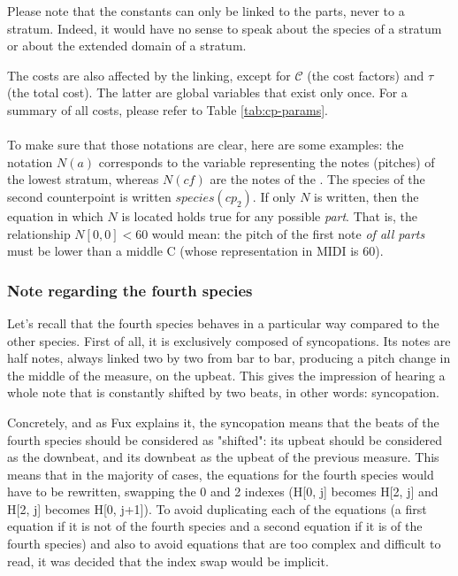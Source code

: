 Please note that the constants can only be linked to the parts, never to a stratum. Indeed, it would have no sense to speak about the species of a stratum or about the extended domain of a stratum.

The costs are also affected by the linking, except for $\mathcal{C}$ (the cost factors) and $\tau$ (the total cost). The latter are global variables that exist only once. For a summary of all costs, please refer to Table \ref{tab:cp-params}.

\paragraph{}
To make sure that those notations are clear, here are some examples: the notation $N(a)$ corresponds to the variable representing the notes (pitches) of the lowest stratum, whereas $N(\mathit{cf})$ are the notes of the \cf. The species of the second counterpoint is written $species(cp_2)$. If only $N$ is written, then the equation in which $N$ is located holds true for any possible \textit{part}. That is, the relationship $N[0, 0] < 60$ would mean: the pitch of the first note \textit{of all parts} must be lower than a middle C (whose representation in MIDI is 60).

\subsubsection{Note regarding the fourth species}\label{nota-bene-4th-species} Let's recall that the fourth species behaves in a particular way compared to the other species. First of all, it is exclusively composed of syncopations. Its notes are half notes, always linked two by two from bar to bar, producing a pitch change in the middle of the measure, on the upbeat. This gives the impression of hearing a whole note that is constantly shifted by two beats, in other words: syncopation.

Concretely, and as Fux explains it, the syncopation means that the beats of the fourth species should be considered as "shifted": its upbeat should be considered as the downbeat, and its downbeat as the upbeat of the previous measure. This means that in the majority of cases, the equations for the fourth species would have to be rewritten, swapping the 0 and 2 indexes (H[0, j] becomes H[2, j] and H[2, j] becomes H[0, j+1]). To avoid duplicating each of the equations (a first equation if it is not of the fourth species and a second equation if it is of the fourth species) and also to avoid equations that are too complex and difficult to read, it was decided that the index swap would be implicit.

